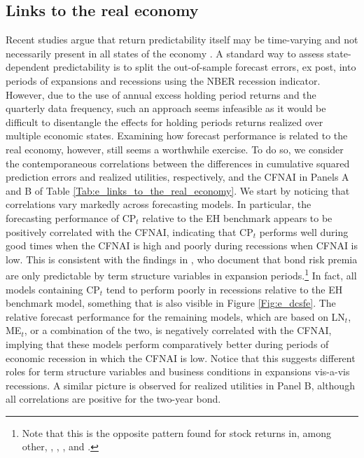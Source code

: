 \documentclass[12pt,letterpaper,leqno,doublespacing]{article}
\begin{document}

\subsection{Links to the real economy}\label{Sec:e_link_economy}
Recent studies argue that return predictability itself may be time-varying and not necessarily present in all states of the economy \citep{HenkelMartinNardari2011,DanglHalling2012,RapachZhou2013,MoellerSander2014,AndreasenEngstedMoellerSander2014}. A standard way to assess state-dependent predictability is to split the out-of-sample forecast errors, ex post, into periods of expansions and recessions using the NBER recession indicator. However, due to the use of annual excess holding period returns and the quarterly data frequency, such an approach seems infeasible as it would be difficult to disentangle the effects for holding periods returns realized over multiple economic states. Examining how forecast performance is related to the real economy, however, still seems a worthwhile exercise. To do so, we consider the contemporaneous correlations between the differences in cumulative squared prediction errors and realized utilities, respectively, and the CFNAI in Panels A and B of Table \ref{Tab:e_links_to_the_real_economy}. We start by noticing that correlations vary markedly across forecasting models. In particular, the forecasting performance of CP$_{t}$ relative to the EH benchmark appears to be positively correlated with the CFNAI, indicating that CP$_{t}$ performs well during good times when the CFNAI is high and poorly during recessions when CFNAI is low. This is consistent with the findings in \cite{AndreasenEngstedMoellerSander2014}, who document that bond risk premia are only predictable by term structure variables in expansion periods.\footnote{Note that this is the opposite pattern found for stock returns in, among other, \cite{HenkelMartinNardari2011}, \cite{DanglHalling2012}, \cite{RapachZhou2013}, and \cite{MoellerSander2014}.} In fact, all models containing CP$_{t}$ tend to perform poorly in recessions relative to the EH benchmark model, something that is also visible in Figure \ref{Fig:e_dcsfe}. The relative forecast performance for the remaining models, which are based on LN$_{t}$, ME$_{t}$, or a combination of the two, is negatively correlated with the CFNAI, implying that these models perform comparatively better during periods of economic recession in which the CFNAI is low. Notice that this suggests different roles for term structure variables and business conditions in expansions vis-a-vis recessions. A similar picture is observed for realized utilities in Panel B, although all correlations are positive for the two-year bond.
\end{document}
